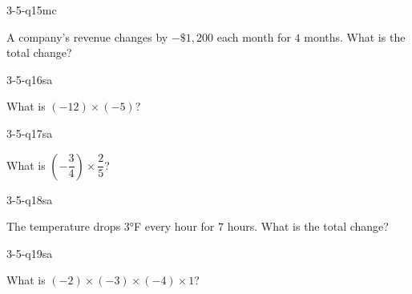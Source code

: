 \begin{practiceQuestion}{3-5-q15}{mc}
\begin{questionText}
A company's revenue changes by $-\$1{,}200$ each month for $4$ months. What is the total change?
\end{questionText}
\end{practiceQuestion}


\begin{practiceQuestion}{3-5-q16}{sa}
\begin{questionText}
What is $(-12) \times (-5)$?
\end{questionText}
\end{practiceQuestion}

\begin{practiceQuestion}{3-5-q17}{sa}
\begin{questionText}
What is $\left(-\dfrac{3}{4}\right) \times \dfrac{2}{5}$?
\end{questionText}
\end{practiceQuestion}

\begin{practiceQuestion}{3-5-q18}{sa}
\begin{questionText}
The temperature drops $3°$F every hour for $7$ hours. What is the total change?
\end{questionText}
\end{practiceQuestion}

\begin{practiceQuestion}{3-5-q19}{sa}
\begin{questionText}
What is $(-2) \times (-3) \times (-4) \times 1$?
\end{questionText}
\end{practiceQuestion}


